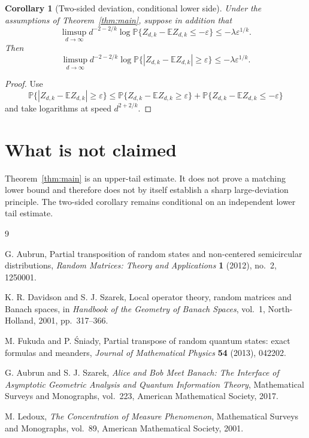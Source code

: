 \documentclass[11pt]{article}
\newtheorem{corollary}[theorem]{Corollary}
\newcommand{\Prob}{\mathbb P}
\newcommand{\E}{\mathbb E}
\newcommand{\eps}{\varepsilon}
\begin{document}
\begin{corollary}[Two-sided deviation, conditional lower side]\label{cor:two-sided}
Under the assumptions of Theorem~\ref{thm:main}, suppose in addition that
\[
  \limsup_{d\to\infty}d^{-2-2/k}\log \Prob\{Z_{d,k}-\E Z_{d,k}\le -\eps\}
  \le -\lambda\eps^{1/k}.
\]
Then
\[
  \limsup_{d\to\infty}d^{-2-2/k}\log \Prob\{|Z_{d,k}-\E Z_{d,k}|\ge \eps\}
  \le -\lambda\eps^{1/k}.
\]
\end{corollary}

\begin{proof}
Use
\[
  \Prob\{|Z_{d,k}-\E Z_{d,k}|\ge \eps\}
  \le
  \Prob\{Z_{d,k}-\E Z_{d,k}\ge \eps\}
  +\Prob\{Z_{d,k}-\E Z_{d,k}\le -\eps\}
\]
and take logarithms at speed $d^{2+2/k}$.
\end{proof}

\section{What is not claimed}

Theorem~\ref{thm:main} is an upper-tail estimate.  It does not prove a matching
lower bound and therefore does not by itself establish a sharp large-deviation
principle.  The two-sided corollary remains conditional on an independent lower
tail estimate.

\begin{thebibliography}{9}

G. Aubrun,
\newblock Partial transposition of random states and non-centered semicircular distributions,
\newblock \emph{Random Matrices: Theory and Applications} \textbf{1} (2012), no.~2, 1250001.

K. R. Davidson and S. J. Szarek,
\newblock Local operator theory, random matrices and Banach spaces,
\newblock in \emph{Handbook of the Geometry of Banach Spaces}, vol.~1,
North-Holland, 2001, pp.~317--366.

M. Fukuda and P. \'Sniady,
\newblock Partial transpose of random quantum states: exact formulas and meanders,
\newblock \emph{Journal of Mathematical Physics} \textbf{54} (2013), 042202.

G. Aubrun and S. J. Szarek,
\newblock \emph{Alice and Bob Meet Banach: The Interface of Asymptotic Geometric Analysis and Quantum Information Theory},
\newblock Mathematical Surveys and Monographs, vol.~223, American Mathematical Society, 2017.

M. Ledoux,
\newblock \emph{The Concentration of Measure Phenomenon},
\newblock Mathematical Surveys and Monographs, vol.~89, American Mathematical Society, 2001.

\end{thebibliography}
\end{document}
